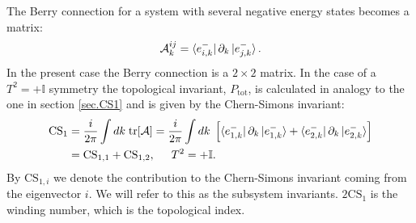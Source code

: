 The Berry connection for a system with several negative energy states becomes a matrix:
\begin{equation}
\mathcal{A}^{ij}_k = \bra{e^{-}_{i,k}}\partial_k\ket{e^{-}_{j,k}}.
\end{equation}
In the present case the Berry connection is a $2\times 2$ matrix. In the case of a $T^2 = + \mathbb{I}$ symmetry the topological invariant, $P_{\text{tot}}$, is calculated in analogy to the one in section \ref{sec.CS1} and is given by the Chern-Simons invariant:
\begin{align}
\text{CS}_1 &= \frac{i}{2\pi} \int dk\; \text{tr}[\mathcal{A}] = \frac{i}{2\pi} \int dk\; \left[\bra{e^{-}_{1,k}}\partial_k\ket{e^{-}_{1,k}} + \bra{e^{-}_{2,k}}\partial_k\ket{e^{-}_{2,k}}  \right] \nonumber \\
 &= \text{CS}_{1,1} + \text{CS}_{1,2}, \hspace{0.5cm} T^2 = +\mathbb{I}.
\label{eq.2wires.CS1}
\end{align}
By $\text{CS}_{1,i}$ we denote the contribution to the Chern-Simons invariant coming from the eigenvector $i$. We will refer to this as the subsystem invariants. $2\text{CS}_1$ is the winding number, which is the topological index. 

